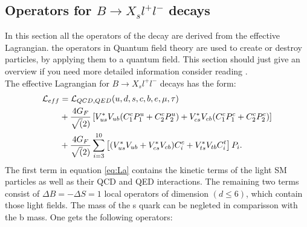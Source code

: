 \documentclass[english]{uzhpub}
\begin{document}
 \subsection{Operators for $B \rightarrow X_s l^+l^-$ decays}
 In this section all the operators of the decay are derived from the effective Lagrangian. the operators in Quantum field theory are used to create or destroy particles, by applying them to a quantum field. This section should just give an overview if you need more detailed information consider reading \cite{bib:Operators}. \\
 The effective Lagrangian for $B \rightarrow X_s l^+l^-$ decays has the form:
 \begin{align}
  \mathcal{L}_{eff} & = \mathcal{L}_{QCD,QED}(u,d,s,c,b,e,\mu,\tau) \notag                                                                                           \\
                    & + \frac{4G_F}{\sqrt(2)} \left[ V_{us}^* V_{ub} (C_1^c P_1^u + C_2^c P_2^u) + V_{cs}^* V_{cb} (C_1^c P_1^c + C_2^c P_2^c) \right] \label{eq:La} \\
                    & + \frac{4G_F}{\sqrt(2)} \sum_{i=3}^{10} \left[ (V_{us}^* V_{ub} + V_{cs}^* V_{cb})C_i^c + V_{ts}^* V_{tb} C_i^t  \right]P_i . \notag
 \end{align}
 The first term in equation \ref{eq:La} contains the kinetic terms of the light SM particles as well as their QCD and QED interactions. The remaining two terms consist of $\Delta B = - \Delta S =1$ local operators of dimension $(d \leq 6)$, which contain those light fields. The mass of the s quark can be negleted in comparisson with the b mass. One gets the following operators:
\end{document}
